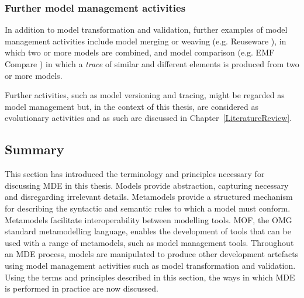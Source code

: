 \subsubsection{Further model management activities}
In addition to model transformation and validation, further examples of model management activities include model merging or weaving (e.g. Reuseware \cite{henriksson08reuseware}), in which two or more models are combined, and model comparison (e.g. EMF Compare \cite{brun08emfcompare}) in which a \emph{trace} of similar and different elements is produced from two or more models.

Further activities, such as model versioning and tracing, might be regarded as model management but, in the context of this thesis, are considered as evolutionary activities and as such are discussed in Chapter~\ref{LiteratureReview}.

\subsection{Summary}
This section has introduced the terminology and principles necessary for discussing MDE in this thesis. Models provide abstraction, capturing necessary and disregarding irrelevant details. Metamodels provide a structured mechanism for describing the syntactic and semantic rules to which a model must conform. Metamodels facilitate interoperability between modelling tools. MOF, the OMG standard metamodelling language, enables the development of tools that can be used with a range of metamodels, such as model management tools. Throughout an MDE process, models are manipulated to produce other development artefacts using model management activities such as model transformation and validation. Using the terms and principles described in this section, the ways in which MDE is performed in practice are now discussed.
